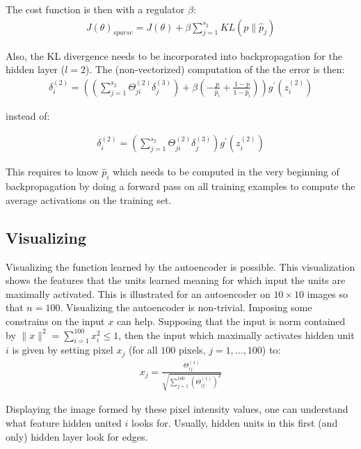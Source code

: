 \documentclass{report}
\begin{document}
The cost function is then with a regulator $\beta$:
\begin{align*}
J(\theta)_{sparse} = J(\theta) + \beta \sum_{j=1}^{s_2} KL(p\rVert \hat{p}_j)
\end{align*}

Also, the KL divergence needs to be incorporated into backpropagation for the hidden layer ($l=2$). The (non-vectorized) computation of the the error is then:
\begin{align*}
\delta^{(2)}_i=((\sum_{j=1}^{s_2} \Theta_{ji}^{(2)}\delta_j^{(3)}) + \beta(-\frac{p}{\hat{p}_i}+\frac{1-p}{1-\hat{p}_i}))g^{'}(z_i^{(2)})
\end{align*}


instead of:

\begin{align*}
\delta^{(2)}_i=(\sum_{j=1}^{s_2} \Theta_{ji}^{(2)}\delta_j^{(3)})g^{'}(z_i^{(2)})
\end{align*}

This requires to know $\hat{p}_i$ which needs to be computed in the very beginning of backpropagation by doing a forward pass on all training examples to compute the average activations on the training set.

\subsection{Visualizing}
Visualizing the function learned by the autoencoder is possible.
This visualization shows the features that the units learned meaning for which input the units are maximally activated.
This is illustrated for an autoencoder on $10\times 10$ images so that $n=100$.
Visualizing the autoencoder is non-trivial. Imposing some constrains on the input $x$ can help.
Supposing that the input is norm contained by $\lVert x \rVert^2 = \sum_{i=1}^{100} x_i^2 \le 1$, then the input which maximally activates hidden unit $i$ is given by setting pixel $x_j$ (for all $100$ pixels, $j=1,...,100$) to:
\begin{align*}
x_j = \frac{\Theta_{ij}^{(1)}}{\sqrt{\sum_{j=1}^{100} (\Theta_{ij}^{(1)})^2}}
\end{align*}

Displaying the image formed by these pixel intensity values, one can understand what feature hidden united $i$ looks for. Usually, hidden units in this first (and only) hidden layer look for edges.
\end{document}
